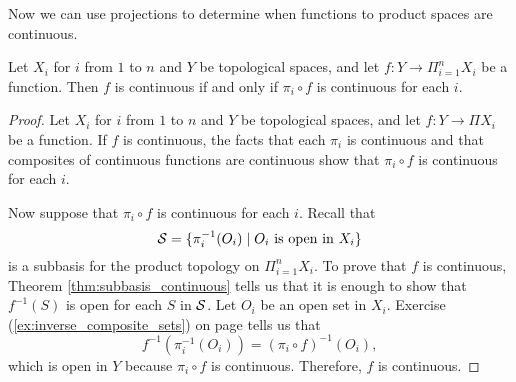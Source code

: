 





Now we can use projections to determine when functions to product spaces are continuous.

\begin{theorem} \label{thm:prod_continuity} Let $X_i$ for $i$ from $1$ to $n$ and $Y$ be topological spaces, and let $f: Y \to \Pi_{i=1}^n X_i$ be a function. Then $f$ is continuous if and only if $\pi_i \circ f$ is continuous for each $i$. 
\end{theorem}

\begin{proof} Let $X_i$ for $i$ from $1$ to $n$ and $Y$ be topological spaces, and let $f: Y \to \Pi X_i$ be a function. If $f$ is continuous, the facts that each $\pi_i$ is continuous and that composites of continuous functions are continuous show  that $\pi_i \circ f$ is continuous for each $i$. 

Now suppose that $\pi_i \circ f$ is continuous for each $i$. Recall that 
\[\mathcal{S} = \{\pi_i^{-1}(O_i) \mid O_i \text{ is open in } X_i\}\]
is a subbasis for the product topology on $\Pi_{i=1}^n X_i$. To prove that $f$ is continuous, Theorem \ref{thm:subbasis_continuous} tells us that it is enough to show that $f^{-1}(S)$ is open for each $S$ in $\mathcal{S}$. Let $O_i$ be an open set in $X_i$. Exercise (\ref{ex:inverse_composite_sets}) on page \pageref{ex:inverse_composite_sets} tells us that 
\[f^{-1}(\pi_i^{-1}(O_i)) = (\pi_i \circ f)^{-1}(O_i),\]
which is open in $Y$ because $\pi_i \circ f$ is continuous. Therefore, $f$ is continuous.  
\end{proof}
 
